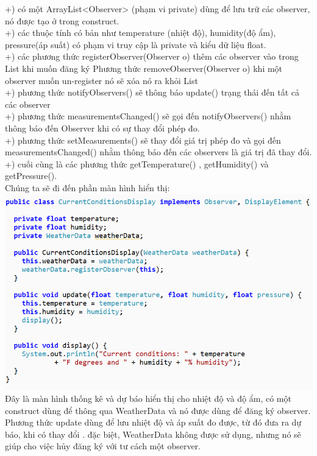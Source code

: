 +) có một ArrayList<Observer> (phạm vi private) dùng để lưu trữ các observer, nó được tạo ở trong construct.\\
+) các thuộc tính có bản như temperature (nhiệt độ), humidity(độ ẩm), pressure(áp suất) có phạm vi truy cập là private và kiểu dữ liệu float.\\
+) các phương thức registerObserver(Observer o) thêm các observer vào trong List khi muốn đăng ký
Phương thức removeObserver(Observer o) khi một observer muốn un-register nó sẽ xóa nó ra khỏi List\\
+) phương thức notifyObservers() sẽ thông báo update() trạng thái đến tất cả các observer\\
+) phương thức measurementsChanged() sẽ gọi đến notifyObservers() nhằm thông báo đến Observer khi có sự thay đổi phép đo.\\
+) phương thức setMeasurements() sẽ thay đổi giá trị phép đo và gọi đến measurementsChanged() nhằm thông báo đến các observers là giá trị đã thay đổi.\\
+) cuối cùng là các phương thức getTemperature() , getHumidity() và getPressure().\\
	Chúng ta sẽ đi đến phần màn hình hiển thị:\\
\includegraphics{GALLEYS/images/chapter2/images6}\\
Đây là màn hình thống kê và dự báo hiển thị cho nhiệt độ và độ ẩm, có một construct dùng để thông qua WeatherData và nó được dùng để đăng ký observer.
Phương thức update dùng để lưu nhiệt độ và áp suất đo được, từ đó đưa ra dự báo, khi có thay đổi . đặc biệt, WeatherData không được sử dụng, nhưng nó sẽ giúp cho việc hủy đăng ký với tư cách một observer.\\
